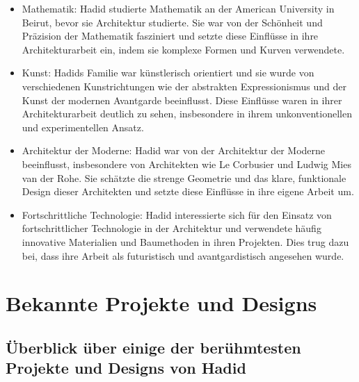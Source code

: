 \documentclass[a4paper]{article}
\begin{document}
\begin{itemize}
\item Mathematik: Hadid studierte Mathematik an der American University in Beirut,
bevor sie Architektur studierte. Sie war von der Schönheit und Präzision der
Mathematik fasziniert und setzte diese Einflüsse in ihre Architekturarbeit ein,
indem sie komplexe Formen und Kurven verwendete.
\item Kunst: Hadids Familie war künstlerisch orientiert und sie wurde von
verschiedenen Kunstrichtungen wie der abstrakten Expressionismus und der Kunst
der modernen Avantgarde beeinflusst. Diese Einflüsse waren in ihrer
Architekturarbeit deutlich zu sehen, insbesondere in ihrem unkonventionellen und
experimentellen Ansatz.
\item Architektur der Moderne: Hadid war von der Architektur der Moderne beeinflusst,
insbesondere von Architekten wie Le Corbusier und Ludwig Mies van der Rohe. Sie
schätzte die strenge Geometrie und das klare, funktionale Design dieser
Architekten und setzte diese Einflüsse in ihre eigene Arbeit um.
\item Fortschrittliche Technologie: Hadid interessierte sich für den Einsatz von
fortschrittlicher Technologie in der Architektur und verwendete häufig
innovative Materialien und Baumethoden in ihren Projekten. Dies trug dazu bei,
dass ihre Arbeit als futuristisch und avantgardistisch angesehen wurde.
\end{itemize}

\section{Bekannte Projekte und Designs}
\subsection{Überblick über einige der berühmtesten Projekte und Designs von Hadid}
\end{document}
